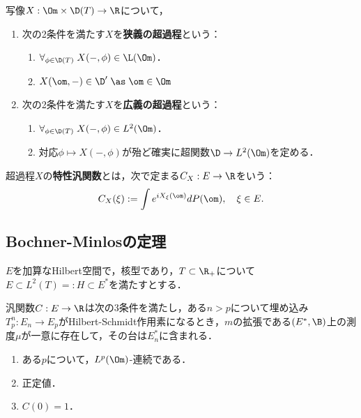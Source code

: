 \documentclass[uplatex,dvipdfmx]{jsreport}
\begin{document}
\begin{definition}
    写像$X:\Om\times\D(T)\to\R$について，
    \begin{enumerate}
        \item 次の2条件を満たす$X$を\textbf{狭義の超過程}という：
        \begin{enumerate}
            \item $\forall_{\phi\in\D(T)}\;X(-,\phi)\in\L(\Om)$．
            \item $X(\om,-)\in\D'\;\as\;\om\in\Om$
        \end{enumerate}
        \item 次の2条件を満たす$X$を\textbf{広義の超過程}という：
        \begin{enumerate}
            \item $\forall_{\phi\in\D(T)}\;X(-,\phi)\in L^2(\Om)$．
            \item 対応$\phi\mapsto X(-,\phi)$が殆ど確実に超関数$\D\to L^2(\Om)$を定める．
        \end{enumerate}
    \end{enumerate}
\end{definition}

\begin{definition}
    超過程$X$の\textbf{特性汎関数}とは，次で定まる$C_X:E\to\R$をいう：
    \[C_X(\xi):=\int e^{iX_\xi(\om)}dP(\om),\quad\xi\in E.\]
\end{definition}

\subsection{Bochner-Minlosの定理}

\begin{notation}
    $E$を加算なHilbert空間で，核型であり，$T\subset\R_+$について$E\subset L^2(T)=:H\subset E^*$を満たすとする．
\end{notation}

\begin{theorem}
    汎関数$C:E\to\R$は次の3条件を満たし，ある$n>p$について埋め込み$T^n_p:E_n\to E_p$がHilbert-Schmidt作用素になるとき，$m$の拡張である$(E^*,\B)$上の測度$\mu$が一意に存在して，その台は$E_n^*$に含まれる．
    \begin{enumerate}
        \item ある$p$について，$L^p(\Om)$-連続である．
        \item 正定値．
        \item $C(0)=1$．
    \end{enumerate}
\end{theorem}
\end{document}
